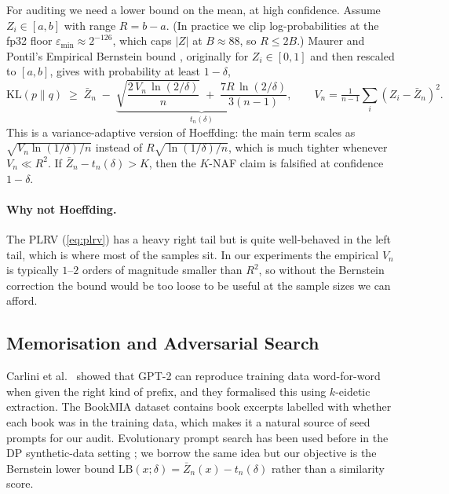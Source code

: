 \documentclass{article}
\begin{document}
For auditing we need a lower bound on the mean, at high confidence. Assume $Z_i\in[a,b]$ with range $R=b-a$. (In practice we clip log-probabilities at the fp32 floor $\varepsilon_{\min}\approx 2^{-126}$, which caps $|Z|$ at $B\approx 88$, so $R\le 2B$.) Maurer and Pontil's Empirical Bernstein bound \cite[Thm.~4]{maurer2009bernstein}, originally for $Z_i\in[0,1]$ and then rescaled to $[a,b]$, gives with probability at least $1-\delta$,
\begin{equation}
\label{eq:bernstein}
  \mathrm{KL}(p\|q) \;\ge\; \bar{Z}_n \;-\; \underbrace{\sqrt{\frac{2\, V_n\,\ln(2/\delta)}{n}} \;+\; \frac{7R\,\ln(2/\delta)}{3(n-1)}}_{\,t_n(\delta)\,},\qquad V_n = \tfrac{1}{n-1}\sum_i (Z_i-\bar{Z}_n)^2.
\end{equation}
This is a variance-adaptive version of Hoeffding: the main term scales as $\sqrt{V_n \ln(1/\delta)/n}$ instead of $R\sqrt{\ln(1/\delta)/n}$, which is much tighter whenever $V_n\ll R^2$. If $\bar{Z}_n-t_n(\delta)>K$, then the $K$-NAF claim is falsified at confidence $1-\delta$.

\paragraph{Why not Hoeffding.}
The PLRV (\ref{eq:plrv}) has a heavy right tail but is quite well-behaved in the left tail, which is where most of the samples sit. In our experiments the empirical $V_n$ is typically $1$--$2$ orders of magnitude smaller than $R^2$, so without the Bernstein correction the bound would be too loose to be useful at the sample sizes we can afford.

\subsection{Memorisation and Adversarial Search}

Carlini et al.\ \cite{carlini2021extracting} showed that GPT-2 can reproduce training data word-for-word when given the right kind of prefix, and they formalised this using $k$-eidetic extraction. The BookMIA dataset \cite{shi2024bookmia} contains book excerpts labelled with whether each book was in the training data, which makes it a natural source of seed prompts for our audit. Evolutionary prompt search has been used before in the DP synthetic-data setting \cite{xie2024dpsynthtext}; we borrow the same idea but our objective is the Bernstein lower bound $\mathrm{LB}(x;\delta)=\bar{Z}_n(x)-t_n(\delta)$ rather than a similarity score.
\end{document}
